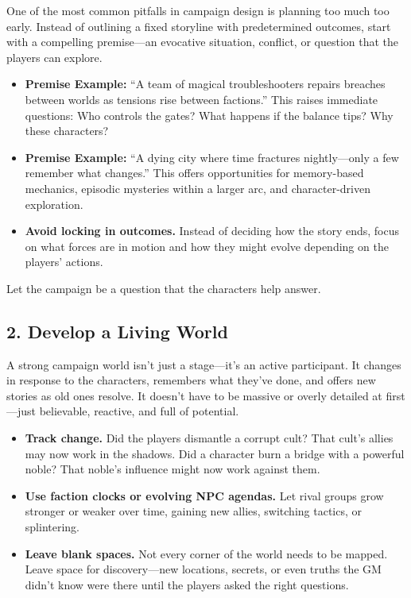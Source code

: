 One of the most common pitfalls in campaign design is planning too much too early. Instead of outlining a fixed storyline with predetermined outcomes, start with a compelling premise—an evocative situation, conflict, or question that the players can explore.

\begin{itemize}\raggedright
    \item \textbf{Premise Example:} “A team of magical troubleshooters repairs breaches between worlds as tensions rise between factions.”  
    This raises immediate questions: Who controls the gates? What happens if the balance tips? Why these characters?

    \item \textbf{Premise Example:} “A dying city where time fractures nightly—only a few remember what changes.”  
    This offers opportunities for memory-based mechanics, episodic mysteries within a larger arc, and character-driven exploration.

    \item \textbf{Avoid locking in outcomes.} Instead of deciding how the story ends, focus on what forces are in motion and how they might evolve depending on the players’ actions.
\end{itemize}

Let the campaign be a question that the characters help answer.

\subsection*{2. Develop a Living World}

A strong campaign world isn’t just a stage—it’s an active participant. It changes in response to the characters, remembers what they’ve done, and offers new stories as old ones resolve. It doesn’t have to be massive or overly detailed at first—just believable, reactive, and full of potential.

\begin{itemize}
    \item \textbf{Track change.} Did the players dismantle a corrupt cult? That cult’s allies may now work in the shadows. Did a character burn a bridge with a powerful noble? That noble’s influence might now work against them.
    
    \item \textbf{Use faction clocks or evolving NPC agendas.} Let rival groups grow stronger or weaker over time, gaining new allies, switching tactics, or splintering.

    \item \textbf{Leave blank spaces.} Not every corner of the world needs to be mapped. Leave space for discovery—new locations, secrets, or even truths the GM didn’t know were there until the players asked the right questions.
\end{itemize}

